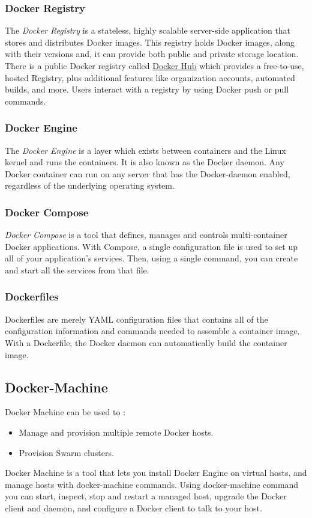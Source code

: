 \documentclass[12pt]{article}
\begin{document}
\subsubsection{Docker Registry}
The \textit{Docker Registry} is a stateless, highly scalable server-side application that stores and distributes Docker images. This registry holds Docker images, along with their versions and, it can provide both public and private storage location. There is a public Docker registry called \href{https://hub.docker.com/}{Docker Hub} which provides a free-to-use, hosted Registry, plus additional features like organization accounts, automated builds, and more. Users interact with a registry by using Docker push or pull commands.
\subsubsection{Docker Engine}
The \textit{Docker Engine} is a layer which exists between containers and the Linux kernel and runs the containers. It is also known as the Docker daemon. Any Docker container can run on any server that has the Docker-daemon enabled, regardless of the underlying operating system.
\subsubsection{Docker Compose}
\textit{Docker Compose} is a tool that defines, manages and controls multi-container Docker applications. With Compose, a single configuration file is used to set up all of your application’s services. Then, using a single command, you can create and start all the services from that file.
\subsubsection{Dockerfiles}
Dockerfiles are merely YAML configuration files that contains all of the configuration information and commands needed to assemble a container image. With a Dockerfile, the Docker daemon can automatically build the container image.
\subsection{Docker-Machine}
Docker Machine can be used to :
\begin{itemize}
	\item Manage and provision multiple remote Docker hosts.
	\item Provision Swarm clusters.
\end{itemize}
Docker Machine is a tool that lets you install Docker Engine on virtual hosts, and manage hosts with docker-machine commands. Using docker-machine command you can start, inspect, stop and restart a managed host, upgrade the Docker client and daemon, and configure a Docker client to talk to your host.
\end{document}
